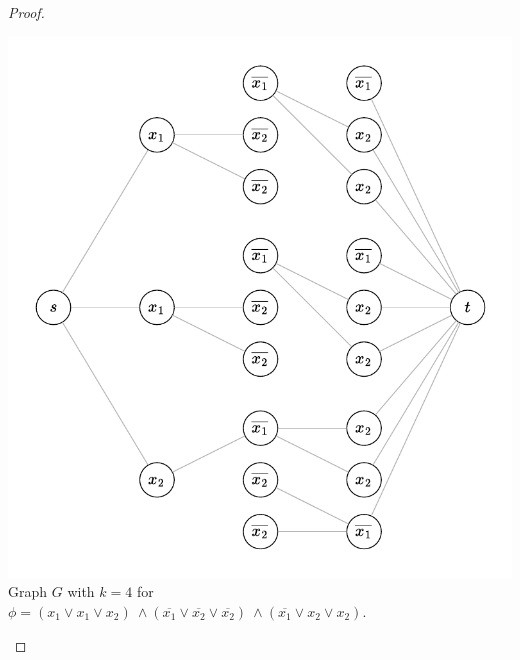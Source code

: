 \documentclass[11pt]{article}
\begin{document}
\begin{proof}
\begin{center}
\includegraphics[scale=0.7]{Figures/Problem7.21.pdf} \\
Graph $G$ with $k=4$ for \\
$\phi = (x_1 \vee x_1 \vee x_2) \ \wedge (\overline{x_1} \vee \overline{x_2} \vee \overline{x_2}) \ \wedge (\overline{x_1} \vee x_2 \vee x_2)$.
\end{center}

\end{proof}
\end{document}
